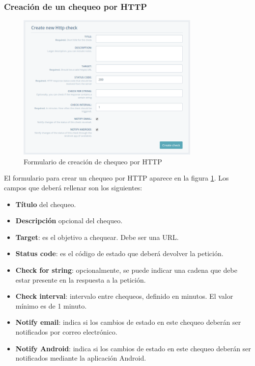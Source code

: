 \subsubsection{Creación de un chequeo por HTTP}

\begin{figure}[hbtp]
  \centering
  \includegraphics[width=0.8\textwidth]{apendice_manual_usuario/pantalla_crear_http.png}
  \caption{Formulario de creación de chequeo por HTTP}
  \label{fig:crear-http}
\end{figure}

El formulario para crear un chequeo por HTTP aparece en la figura
\ref{fig:crear-http}. Los campos que deberá rellenar son los siguientes:

\begin{itemize}
\item \textbf{Título} del chequeo.
\item \textbf{Descripción} opcional del chequeo.
\item \textbf{Target}: es el objetivo a chequear. Debe ser una URL.
\item \textbf{Status code}: es el código de estado que deberá devolver la petición.
\item \textbf{Check for string}: opcionalmente, se puede indicar una cadena que
  debe estar presente en la respuesta a la petición.
\item \textbf{Check interval}: intervalo entre chequeos, definido en minutos. El
  valor mínimo es de 1 minuto.
\item \textbf{Notify email}: indica si los cambios de estado en este chequeo
  deberán ser notificados por correo electrónico.
\item \textbf{Notify Android}: indica si los cambios de estado en este chequeo
  deberán ser notificados mediante la aplicación Android.
\end{itemize}


